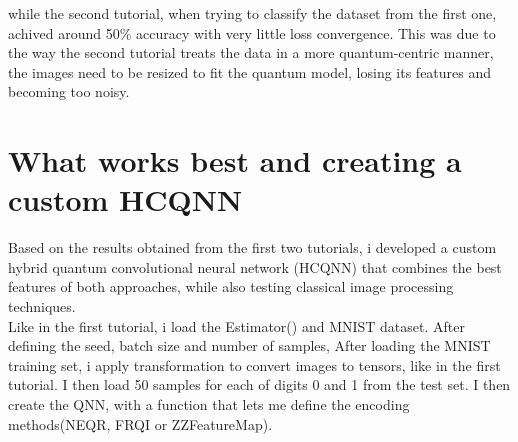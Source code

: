 \documentclass[conference]{IEEEtran}
\begin{document}
\begin{table}[ht]
\centering
{}
\caption{accuracy and final loss of the tests}
\end{table}

while the second tutorial, when trying to classify the dataset from the first one, achived around 50\% accuracy with very little loss convergence. This was due to the way the second tutorial treats the data in a more quantum-centric manner, the images need to be resized to fit the quantum model, losing its features and becoming too noisy.



\section*{\fontsize{16}{20}\selectfont What works best and creating a custom HCQNN}
Based on the results obtained from the first two tutorials, i developed a custom hybrid quantum convolutional neural network (HCQNN) that combines the best features of both approaches, while also testing classical image processing techniques.\\
Like in the first tutorial, i load the Estimator() and MNIST dataset. After defining the seed, batch size and number of samples, 
After loading the MNIST training set, i apply transformation to convert images to tensors, like in the first tutorial.
I then load 50 samples for each of digits 0 and 1 from the test set.
I then create the QNN, with a function that lets me define the encoding methods(NEQR, FRQI or ZZFeatureMap).
\end{document}
